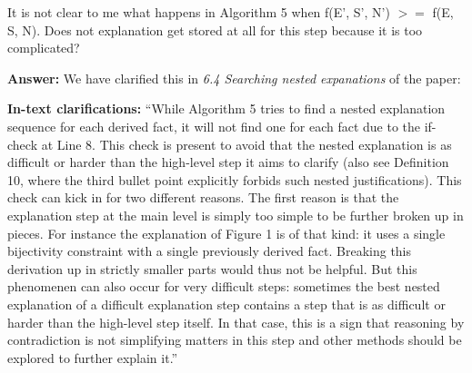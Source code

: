 \documentclass{article}
\newcommand\comment[1]{\marginpar{\tiny #1}}
\renewcommand\comment[1]{#1}
\newcommand{\tias}[1]{{\comment{\color{blue}\textsc{TG:}#1}}}
\newcommand{\emilio}[1]{{\comment{\color{red} \textsc{EG:}#1}}}
\newcommand{\answer}[1]{{\comment{\textbf{Answer:} #1}}}
\newcommand{\clarification}[1]{{\comment{\textbf{In-text clarifications:} #1}}}
\newcommand{\tempanswer}[1]{{\comment{\color{orange} \textbf{Temporary answer:} #1}}}
\newcommand{\bart}[1]{{\comment{\color{green} \textsc{BB:}#1}}}
\begin{document}


\begin{quoteit}
It is not clear to me what happens in Algorithm 5 when f(E', S', N') $>=$ f(E, S, N). Does not explanation get stored at all for this step because it is too complicated? 
\end{quoteit}

\answer{We have clarified this in \emph{6.4 Searching nested expanations} of the paper:}

\clarification{
		``While Algorithm 5 tries to find a nested explanation sequence for each derived fact, it will not find one for each fact due to the if-check at Line 8. 
		This check is present to avoid that the nested explanation is as difficult or harder than the high-level step it aims to clarify (also see Definition 10, where the third bullet point explicitly forbids such nested justifications).  
		This check can kick in for two different reasons. The first reason is that the explanation step at the main level is simply too simple to be further broken up in pieces. For instance the explanation of Figure 1 is of that kind: it uses a single bijectivity constraint with a single previously derived fact. Breaking this derivation up in strictly smaller parts would thus not be helpful. But this phenomenen can also occur for very difficult steps: sometimes the best nested explanation of a difficult explanation step contains a step that is as difficult or harder than the high-level step itself. In that case, this is a sign that reasoning by contradiction is not simplifying matters in this step and other methods should be explored to further explain it.''}
\end{document}
